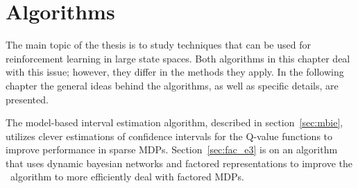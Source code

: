 \chapter{Algorithms}
\label{ch:algo}

The main topic of the thesis is to study techniques that can be used for
reinforcement learning in large state spaces. Both algorithms in this chapter deal with this
issue; however, they differ in the methods they apply. In the following chapter
the general ideas behind the algorithms, as well as specific details, are
presented. 

The model-based interval estimation algorithm, described in
section~\ref{sec:mbie}, utilizes clever estimations of confidence intervals for
the Q-value functions to improve performance in sparse MDPs.
Section~\ref{sec:fac_e3} is on an algorithm that uses dynamic bayesian networks
and factored representations to improve the \etre\ algorithm to more efficiently deal with factored MDPs. 




